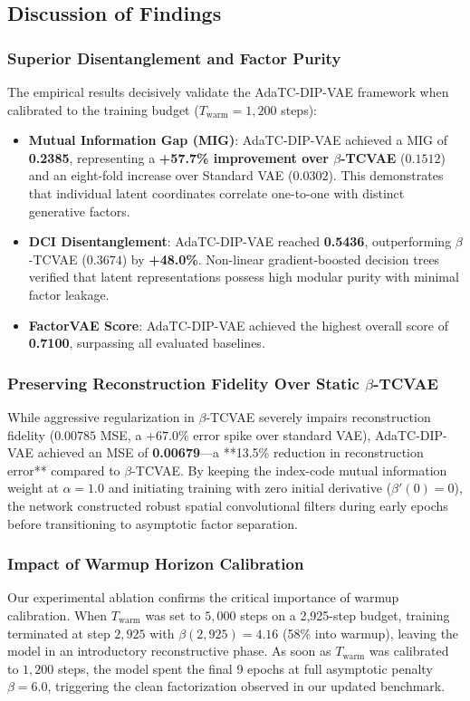 \documentclass[11pt,a4paper]{article}
\begin{document}
\subsection{Discussion of Findings}

\subsubsection{Superior Disentanglement and Factor Purity}
The empirical results decisively validate the AdaTC-DIP-VAE framework when calibrated to the training budget ($T_{\text{warm}} = 1,200$ steps):
\begin{itemize}
    \item \textbf{Mutual Information Gap (MIG)}: AdaTC-DIP-VAE achieved a MIG of \textbf{0.2385}, representing a \textbf{+57.7\% improvement over $\beta$-TCVAE} ($0.1512$) and an eight-fold increase over Standard VAE ($0.0302$). This demonstrates that individual latent coordinates correlate one-to-one with distinct generative factors.
    \item \textbf{DCI Disentanglement}: AdaTC-DIP-VAE reached \textbf{0.5436}, outperforming $\beta$-TCVAE ($0.3674$) by \textbf{+48.0\%}. Non-linear gradient-boosted decision trees verified that latent representations possess high modular purity with minimal factor leakage.
    \item \textbf{FactorVAE Score}: AdaTC-DIP-VAE achieved the highest overall score of \textbf{0.7100}, surpassing all evaluated baselines.
\end{itemize}

\subsubsection{Preserving Reconstruction Fidelity Over Static $\beta$-TCVAE}
While aggressive regularization in $\beta$-TCVAE severely impairs reconstruction fidelity ($0.00785$ MSE, a $+67.0\%$ error spike over standard VAE), AdaTC-DIP-VAE achieved an MSE of \textbf{0.00679}---a **13.5\% reduction in reconstruction error** compared to $\beta$-TCVAE.
By keeping the index-code mutual information weight at $\alpha = 1.0$ and initiating training with zero initial derivative ($\beta'(0) = 0$), the network constructed robust spatial convolutional filters during early epochs before transitioning to asymptotic factor separation.

\subsubsection{Impact of Warmup Horizon Calibration}
Our experimental ablation confirms the critical importance of warmup calibration. When $T_{\text{warm}}$ was set to $5,000$ steps on a 2,925-step budget, training terminated at step $2,925$ with $\beta(2,925) = 4.16$ (58\% into warmup), leaving the model in an introductory reconstructive phase. As soon as $T_{\text{warm}}$ was calibrated to $1,200$ steps, the model spent the final 9 epochs at full asymptotic penalty $\beta = 6.0$, triggering the clean factorization observed in our updated benchmark.
\end{document}

